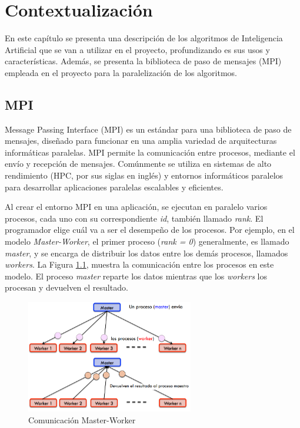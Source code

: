 \chapter{Contextualización}
\label{cap:c2_context}



	En este capítulo se presenta una descripción de los algoritmos de Inteligencia Artificial que se van a utilizar en el proyecto, profundizando es sus usos y características. Además, se presenta la biblioteca de paso de mensajes (MPI) empleada en el proyecto para la paralelización de los algoritmos.
	

\section{MPI}

	Message Passing Interface\cite{barker2015message}  (MPI) es un estándar para una biblioteca de paso de mensajes, diseñado para funcionar en una amplia variedad de arquitecturas informáticas paralelas. MPI permite la comunicación entre procesos, mediante el envío y recepción de mensajes. Comúnmente se utiliza en sistemas de alto rendimiento\cite{stone1990high} (HPC, por sus siglas en inglés) y entornos informáticos paralelos para desarrollar aplicaciones paralelas escalables y eficientes.
	
	
	Al crear el entorno MPI en una aplicación, se ejecutan en paralelo varios procesos, cada uno con su correspondiente \textit{id}, también llamado \textit{rank}. El programador elige cuál va a ser el desempeño de los procesos. Por ejemplo, en el modelo \textit{Master-Worker}, el primer proceso (\textit{rank = 0}) generalmente, es llamado \textit{master}, y se encarga de distribuir los datos entre los demás procesos, llamados \textit{workers}. La Figura \ref{fig:comunicacion_mw}, muestra la comunicación entre los procesos en este modelo. El proceso \textit{master} reparte los datos mientras que los \textit{workers} los procesan y devuelven el resultado.


	\begin{figure}[!h]
		\centering
		\includegraphics[width=0.65\textwidth]{images/chapter_2/mpi_1}
		\caption{Comunicación Master-Worker}
		\label{fig:comunicacion_mw}
	\end{figure}

